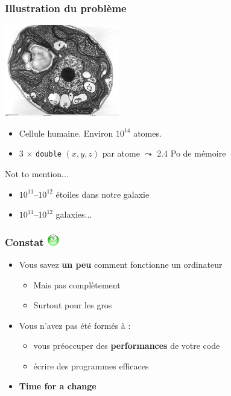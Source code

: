 \documentclass[xcolor={x11names,svgnames}]{beamer}
\newcommand{\triste}{\includegraphics[width=0.5cm,trim=0 17mm 0 0]{triste}}
\newcommand{\red}{\alert}
\begin{document}

\begin{frame}
\frametitle{Illustration du problème}

\begin{center}
\includegraphics[width=5cm]{cell.jpg}
\end{center}

\begin{itemize}
\item Cellule humaine. Environ $10^{14}$ atomes.
\item 3 $\times$ \texttt{double} $(x, y, z)$ par atome $\leadsto$ 2.4 Po de mémoire
\end{itemize}

\medskip

\begin{alertblock}{Not to mention...}
  \begin{itemize}
  \item $10^{11}$--$10^{12}$ étoiles dans notre galaxie
  \item $10^{11}$--$10^{12}$ galaxies...
  \end{itemize}
\end{alertblock}

\end{frame}



\begin{frame}
  \frametitle{Constat \triste}

  \begin{itemize}
  \item Vous savez \textbf{un peu} comment fonctionne un ordinateur
    \begin{itemize}
    \item Mais \red{pas complètement}
    \item Surtout pour les gros
    \end{itemize}

    \medskip
    
  \item Vous n'avez pas été formés à :
    \begin{itemize}
    \item vous \red{préoccuper} des \textbf{performances} de votre code
    \item écrire des programmes \red{efficaces}
    \end{itemize}
    
    \pause
    \bigskip

    \item \Huge \textbf{Time for a change}
    \end{itemize}

\end{frame}
\end{document}
